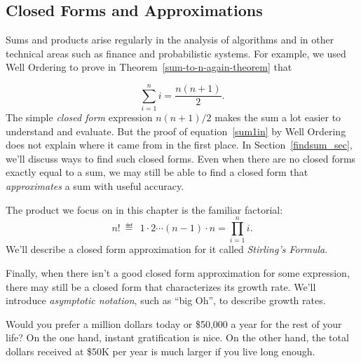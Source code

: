 \label{asymptotics_chap}

\begin{editingnotes}

\section{Closed Forms and Approximations}

Sums and products arise regularly in the analysis of algorithms and in
other technical areas such as finance and probabilistic systems.  For
example, we used Well Ordering to prove in
Theorem~\ref{sum-to-n-again-theorem} that

\begin{equation}\label{sum1in}
\sum_{i=1}^n i = \frac{n(n+1)}{2}.
\end{equation}
The simple \emph{closed form} expression $n(n+1)/2$ makes the sum a
lot easier to understand and evaluate.  But the proof of
equation~\eqref{sum1in} by Well Ordering does not explain where it
came from in the first place.  In Section~\ref{findsum_sec}, we'll
discuss ways to find such closed forms.  Even when there are no closed
forms exactly equal to a sum, we may still be able to find a closed
form that \emph{approximates} a sum with useful accuracy.


The product we focus on in this chapter is the familiar factorial:
\[
n!\ \eqdef\ \ 1 \cdot 2 \cdots  (n-1) \cdot n  = \prod_{i=1}^n i.
\]
We'll describe a closed form approximation for it called \emph{Stirling's
Formula}.

Finally, when there isn't a good closed form approximation for some
expression, there may still be a closed form that characterizes its growth
rate.  We'll introduce \emph{asymptotic notation}, such as ``big Oh'', to
describe growth rates.
\end{editingnotes}


\label{annuity_sec}

Would you prefer a million dollars today or \$50,000 a year for the
rest of your life?  On the one hand, instant gratification is nice.
On the other hand, the total dollars received at \$50K per year is
much larger if you live long enough.

